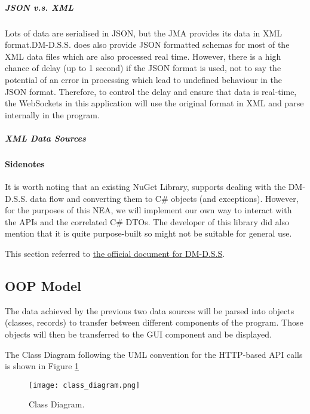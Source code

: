 \subparagraph{JSON v.s. XML}

Lots of data are serialised in JSON, but the JMA provides its data in XML format.DM-D.S.S. does also provide JSON formatted schemas for most of the XML data files which are also processed real time. However, there is a high chance of delay (up to 1 second) if the JSON format is used, not to say the potential of an error in processing which lead to undefined behaviour in the JSON format. Therefore, to control the delay and ensure that data is real-time, the WebSockets in this application will use the original format in XML and parse internally in the program.

\subparagraph{XML Data Sources}





\paragraph{Sidenotes}

It is worth noting that an existing NuGet Library,  supports dealing with the DM-D.S.S. data flow and converting them to C\# objects (and exceptions). However, for the purposes of this NEA, we will implement our own way to interact with the APIs and the correlated C\# DTOs. The developer of this library did also mention that it is quite purpose-built so might not be suitable for general use.

This section referred to \href{https://dmdata.jp/docs/reference/}{the official document for DM-D.S.S}.

\subsection{OOP Model}


The data achieved by the previous two data sources will be parsed into objects (classes, records) to transfer between different components of the program. Those objects will then be transferred to the GUI component and be displayed.

The Class Diagram following the UML convention for the HTTP-based API calls is shown in Figure \ref{fig:classes-http}

\begin{figure}[!ht]
    \centering
    \texttt{[image: class\_diagram.png]}
    \caption{Class Diagram.}
    \label{fig:classes-http}
\end{figure}

